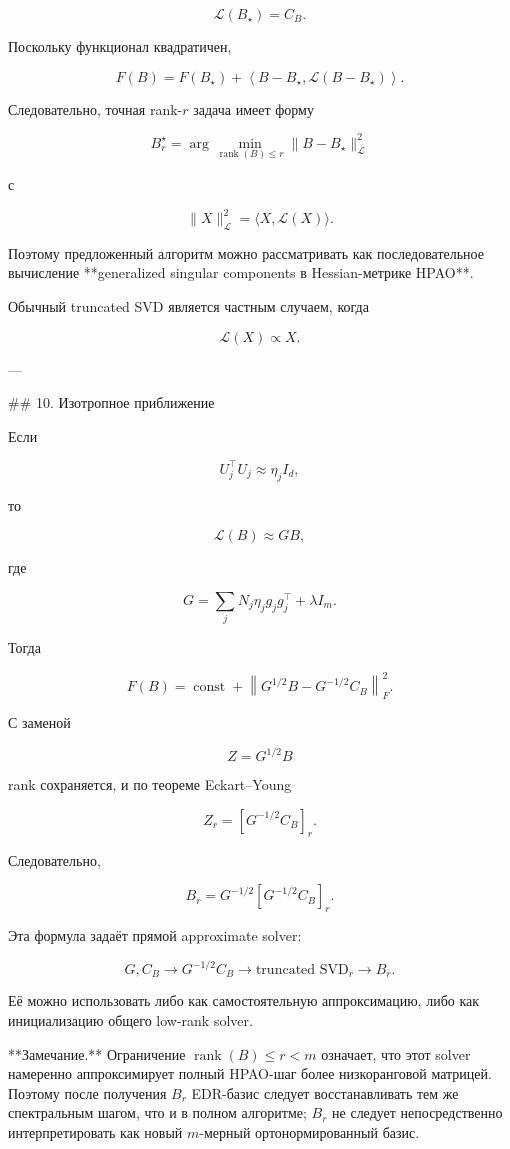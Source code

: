 \[
\mathcal L(B_\star)=C_B.
\]

Поскольку функционал квадратичен,

\[
F(B)
=
F(B_\star)
+
\left\langle
B-B_\star,
\mathcal L(B-B_\star)
\right\rangle.
\]

Следовательно, точная rank-\(r\) задача имеет форму

\[
\boxed{
B_r^\star
=
\arg\min_{\operatorname{rank}(B)\le r}
\|B-B_\star\|_{\mathcal L}^2
}
\]

с

\[
\|X\|_{\mathcal L}^2
=
\langle X,\mathcal L(X)\rangle.
\]

Поэтому предложенный алгоритм можно рассматривать как последовательное вычисление **generalized singular components в Hessian-метрике HPAO**.

Обычный truncated SVD является частным случаем, когда

\[
\mathcal L(X)\propto X.
\]

---

## 10. Изотропное приближение

Если

\[
U_j^\top U_j
\approx
\eta_jI_d,
\]

то

\[
\mathcal L(B)
\approx
GB,
\]

где

\[
G
=
\sum_j
N_j\eta_jg_jg_j^\top
+
\lambda I_m.
\]

Тогда

\[
F(B)
=
\operatorname{const}
+
\left\|
G^{1/2}B-G^{-1/2}C_B
\right\|_F^2.
\]

С заменой

\[
Z=G^{1/2}B
\]

rank сохраняется, и по теореме Eckart–Young

\[
Z_r
=
\left[
G^{-1/2}C_B
\right]_r.
\]

Следовательно,

\[
\boxed{
B_r
=
G^{-1/2}
\left[
G^{-1/2}C_B
\right]_r.
}
\]

Эта формула задаёт прямой approximate solver:

\[
\boxed{
G,C_B
\rightarrow
G^{-1/2}C_B
\rightarrow
\text{truncated SVD}_r
\rightarrow
B_r.
}
\]

Её можно использовать либо как самостоятельную аппроксимацию, либо как инициализацию общего low-rank solver.

**Замечание.** Ограничение \(\operatorname{rank}(B)\le r<m\) означает, что этот solver намеренно аппроксимирует полный HPAO-шаг более низкоранговой матрицей. Поэтому после получения \(B_r\) EDR-базис следует восстанавливать тем же спектральным шагом, что и в полном алгоритме; \(B_r\) не следует непосредственно интерпретировать как новый \(m\)-мерный ортонормированный базис.
